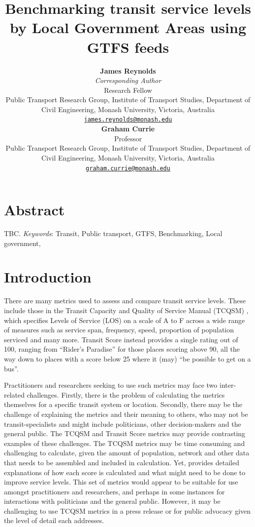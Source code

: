 \documentclass[numbered]{trbunofficial}
\title{Benchmarking transit service levels by Local Government Areas
using GTFS feeds}
\author{%
    \textbf{James Reynolds}\\\textit{Corresponding Author}\\
  Research Fellow\\
  Public Transport Research Group, Institute of Transport Studies,
Department of Civil Engineering, Monash University, Victoria,
Australia\\
  \href{mailto:james.reynolds@monash.edu}{\nolinkurl{james.reynolds@monash.edu}}\\
  \hfill\break
    \textbf{Graham Currie}\\
  Professor\\
  Public Transport Research Group, Institute of Transport Studies,
Department of Civil Engineering, Monash University, Victoria,
Australia\\
  \href{mailto:graham.currie@monash.edu}{\nolinkurl{graham.currie@monash.edu}}\\
  \hfill\break
  }
\begin{document}
\maketitle


\section{Abstract}
TBC.
\hfill\break%
\hfill\break%
\noindent\textit{Keywords}:  Transit, Public
transport, GTFS, Benchmarking, Local government,  
\newpage

\hypertarget{introduction}{%
\section{Introduction}\label{introduction}}

There are many metrics used to assess and compare transit service
levels. These include those in the Transit Capacity and Quality of
Service Manual (TCQSM) \citep{TCQSM:2013}, which specifies Levels of
Service (LOS) on a scale of A to F across a wide range of measures such
as service span, frequency, speed, proportion of population serviced and
many more. Transit Score instead provides a single rating out of 100,
ranging from ``Rider's Paradise'' for those places scoring above 90, all
the way down to places with a score below 25 where it (may) ``be
possible to get on a bus''\citep{WalkScore:2023tg}.

Practitioners and researchers seeking to use such metrics may face two
inter-related challenges. Firstly, there is the problem of calculating
the metrics themselves for a specific transit system or location.
Secondly, there may be the challenge of explaining the metrics and their
meaning to others, who may not be transit-specialists and might include
politicians, other decision-makers and the general public. The TCQSM and
Transit Score metrics may provide contrasting examples of these
challenges. The TCQSM metrics may be time consuming and challenging to
calculate, given the amount of population, network and other data that
needs to be assembled and included in calculation. Yet,
\citet{TCQSM:2013} provides detailed explanations of how each score is
calculated and what might need to be done to improve service levels.
This set of metrics would appear to be suitable for use amongst
practitioners and researchers, and perhaps in some instances for
interactions with politicians and the general public. However, it may be
challenging to use TCQSM metrics in a press release or for public
advocacy given the level of detail each addresses.
\end{document}
